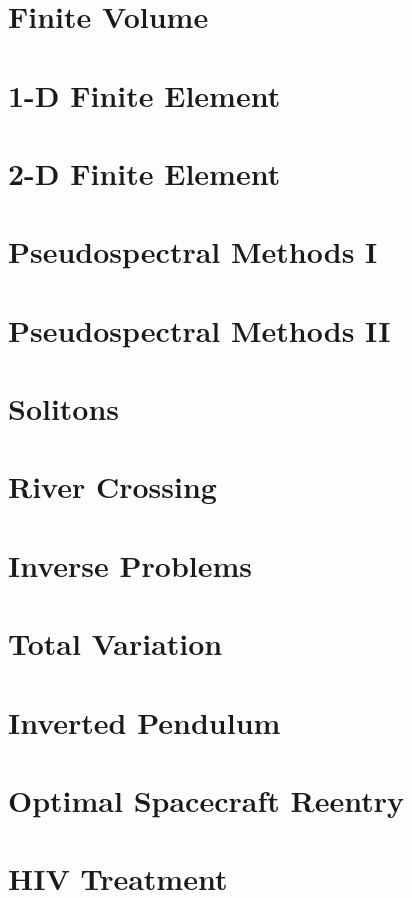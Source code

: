 
\section*{Finite Volume} %

\section*{1-D Finite Element} %

\section*{2-D Finite Element} %

\section*{Pseudospectral Methods I} %

\section*{Pseudospectral Methods II} %

\section*{Solitons} %

\section*{River Crossing} %

\section*{Inverse Problems} %

\section*{Total Variation} %

\section*{Inverted Pendulum} %

\section*{Optimal Spacecraft Reentry} %

\section*{HIV Treatment} %
